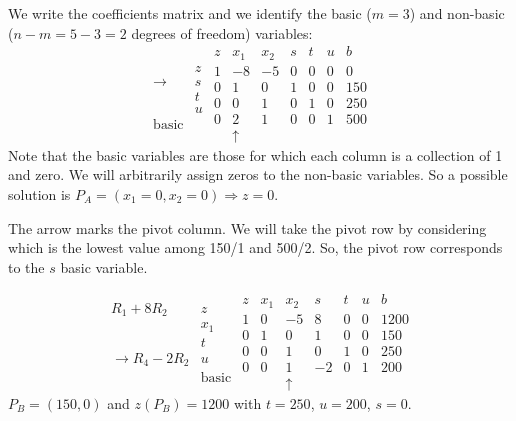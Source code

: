   We write the coefficients matrix and we identify the basic ($m=3$) and non-basic ($n-m=5-3=2$ degrees of freedom) variables:
  \begin{equation}
\begin{array}{cc}
&\\
&z \\
\rightarrow &s \\
&t \\
&u\\
\mathrm{basic}
\end{array}
%
\begin{array}{c|ccccc|c}
  z & x_1 & x_2 & s & t & u & b \\ \hline
  1 & -8 & -5 & 0 & 0 & 0 & 0 \\ \hline
  0 & 1 & 0 & 1 & 0 & 0 & 150  \\
  0 & 0 & 1 & 0 & 1 & 0 & 250 \\
  0 & 2 & 1 & 0 & 0 & 1 & 500 \\
    & \uparrow & & & & &
\end{array}
\end{equation}
  Note that the basic variables are those for which each column is a collection of 1 and zero. We will arbitrarily assign zeros to the non-basic variables.
So a possible solution is $\boxed{P_A=(x_1=0, x_2=0)\Rightarrow z=0}$.

  The arrow marks the pivot column. We will take the pivot row by considering which is the lowest value among 150/1 and 500/2. So, the pivot row corresponds to the $s$ basic variable.



\begin{equation*}
\begin{array}{cc}
&\\
R_1+8R_2&z \\
&x_1 \\
&t \\
\rightarrow R_4-2R_2&u\\
&\mathrm{basic} \\
\end{array}
\begin{array}{c|ccccc|c}
  z & x_1 & x_2 & s & t & u & b \\ \hline
  1 & 0 & -5 & 8 & 0 & 0 & 1200 \\ \hline
  0 & 1 & 0 & 1 & 0 & 0 & 150  \\
  0 & 0 & 1 & 0 & 1 & 0 & 250 \\
  0 & 0 & 1 & -2 & 0 & 1 & 200 \\
    &  & \uparrow& & & &
\end{array}
\end{equation*}
$P_B=(150,0)$ and $z(P_B)=1200$ with $t=250$, $u=200$, $s=0$.

